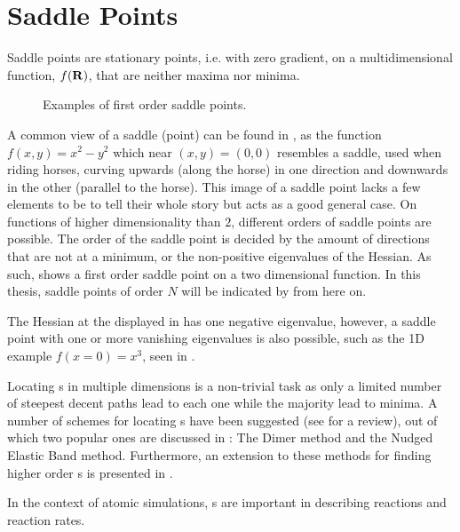 \section{Saddle Points}
\label{sec:sps}


Saddle points are stationary points, i.e. with zero gradient, on a multidimensional function, $f({\mathrm{\mathbf{\bm{R}}}})$, that are neither maxima nor minima.

\begin{figure}[h]
  \begin{center}
    \parbox{0.85\linewidth}{
      \caption{Examples of first order saddle points.
      }
      \label{fig:saddle-points}
    }
  \end{center}
\end{figure}

A common view of a saddle (point) can be found in , as the function $f(x, y) = x^2 - y^2$ which near $(x,y) = (0,0)$ resembles a saddle, used when riding horses, curving upwards (along the horse) in one direction and downwards in the other (parallel to the horse).
This image of a saddle point lacks a few elements to be to tell their whole story but acts as a good general case.
On functions of higher dimensionality than $2$, different orders of saddle points are possible.
The order of the saddle point is decided by the amount of directions that are not at a minimum, or the non-positive eigenvalues of the Hessian.
As such,  shows a first order saddle point on a two dimensional function.
In this thesis, saddle points of order $N$ will be indicated by  from here on.

The Hessian at the \sap{} displayed in  has one negative eigenvalue, however, a saddle point with one or more vanishing eigenvalues is also possible, such as the 1D example $f(x = 0) = x^3$, seen in .

Locating \sap{}s in multiple dimensions is a non-trivial task as only a limited number of steepest decent paths lead to each one while the majority lead to minima.
A number of schemes  for locating s have been suggested (see \cite{sp-mep-review-2002} for a review), out of which two popular ones are discussed in : The Dimer method and the Nudged Elastic Band method.
Furthermore, an extension to these methods for finding higher order \sap{}s is presented in .

In the context of atomic simulations, \sap{}s are important in describing reactions and reaction rates.
